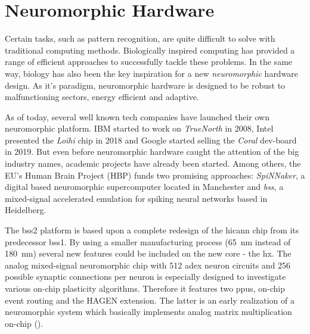 %




\section{Neuromorphic Hardware}

Certain tasks, such as pattern recognition, are quite difficult to solve with traditional computing methods.  Biologically inspired computing has provided a range of efficient approaches to successfully tackle these problems. In the same way, biology has also been the key inspiration for a new \emph{neuromorphic} hardware design. As it's paradigm, neuromorphic hardware is designed to be robust to malfunctioning sectors, energy efficient and adaptive. 

As of today, several well known tech companies have launched their own neuromorphic platform. IBM started to work on \emph{TrueNorth} in 2008, Intel presented the \emph{Loihi} chip in 2018 and Google started selling the \emph{Coral} dev-board in 2019. But even before neuromorphic hardware caught the attention of the big industry names, academic projects have already been started. Among others, the EU's Human Brain Project (HBP) funds two promising approaches: \emph{SpiNNaker}, a digital based neuromorphic supercomputer located in Manchester and \emph{\gls{bss}}, a mixed-signal accelerated emulation for spiking neural networks based in Heidelberg.

The \gls{bss2} platform is based upon a complete redesign of the \gls{hicann} chip from its predecessor \gls{bss1}. By using a smaller manufacturing process (\SI{65}{\nano \m} instead of \SI{180}{\nano \m}) several new features could be included on the new core - the \gls{hx}. The analog mixed-signal neuromorphic chip with 512 \gls{adex} neuron circuits and 256 possible synaptic connections per neuron is especially designed to investigate various on-chip plasticity algorithms. Therefore it features two \glspl{ppu}, on-chip event routing and the HAGEN extension. The latter is an early realization of a neuromorphic system which basically implements analog matrix multiplication on-chip (\cite{schemmel2020accelerated}).

